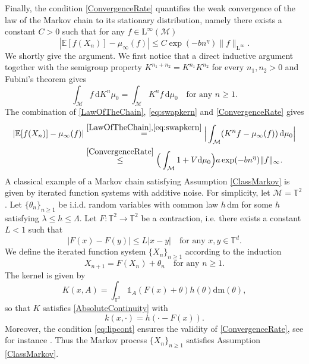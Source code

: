 \documentclass[11pt,a4paper,oneside]{amsart}
\numberwithin{equation}{section}
\newcommand{\dd}{\mathrm{d}}
\newcommand{\LL}{\mathrm{L}}
\newcommand{\m}{\mathrm{m}}
\begin{document}
%
\medskip
%

Finally, the condition \eqref{ConvergenceRate} quantifies the weak convergence of the law of the Markov chain to its stationary distribution, namely there exists a constant $C>0$ such that for any $f \in \LL^\infty(\mathcal{M})$
%
\begin{equation}\label{eq:lemMark}
|\mathbb{E}[f(X_n)] - \mu_\infty(f)| \leq C\exp(-b n^\eta) \| f\|_{\LL^\infty}.
\end{equation}
%
We shortly give the argument. We first notice that a direct inductive argument together with the semigroup property $K^{n_1+n_2} = K^{n_1}K^{n_2}$ for every $n_1,n_2>0$ and Fubini's theorem gives
%
\begin{equation}\label{eq:swapkern}
%
\int_{\mathcal{M}} f\,\dd K^n\mu_0=  \int_{\mathcal{M}} K^n f\, \dd\mu_0\quad\text{for any $n\geq 1$.}
%
\end{equation}
%
The combination of \eqref{LawOfTheChain}, \eqref{eq:swapkern} and \eqref{ConvergenceRate} gives
%
\begin{align*}
%
|\mathbb{E}[f(X_n)] - \mu_\infty(f)| & \stackrel{\eqref{LawOfTheChain},\eqref{eq:swapkern}}{=} \Big| \int_{\mathcal{M}} (K^n f - \mu_\infty(f))\,\dd\mu_0 \Big| \\ & \stackrel{\eqref{ConvergenceRate}}{\le}  \Big(\int_\mathcal{M} 1+V\dd\mu_0\Big)a\exp(-b n^\eta) \|f\|_\infty.
%
\end{align*}
%
A classical example of a Markov chain satisfying Assumption \ref{ClassMarkov} is given by iterated function systems with additive noise. For simplicity, let $\mathcal{M}=\mathbb{T}^2$. Let $\{\theta_n\}_{n\geq 1}$ be i.i.d. random variables with common law $h\,\dd\m$ for some $h$ satisfying $\lambda\leq h\leq \Lambda$. Let $F:\mathbb{T}^2\rightarrow\mathbb{T}^2$ be a contraction, i.e. there exists a constant $L<1$ such that
%
\begin{equation}\label{eq:lipcont}
\vert F(x)-F(y)\vert \le L \vert x-y\vert\quad\text{for any $x,y\in\mathbb{T}^d$.}
\end{equation}
%
We define the iterated function system $\{X_n\}_{n\geq 1}$ according to the induction
%
$$X_{n+1}=F(X_n)+\theta_n\quad\text{for any $n\geq 1$}.$$
%
The kernel is given by 
%
$$K(x,A)=\int_{\mathbb{T}^2}\mathds{1}_A(F(x)+\theta)h(\theta)\dd\m(\theta),$$
%
so that $K$ satisfies \eqref{AbsoluteContinuity} with 
%
$$k(x,\cdot)=h(\cdot-F(x)).$$
%
Moreover, the condition \eqref{eq:lipcont} ensures the validity of \eqref{ConvergenceRate}, see for instance \cite[Theorem 3.2]{alsm03}. Thus the Markov process $\{X_n\}_{n\ge1}$ satisfies Assumption \ref{ClassMarkov}.
\end{document}
